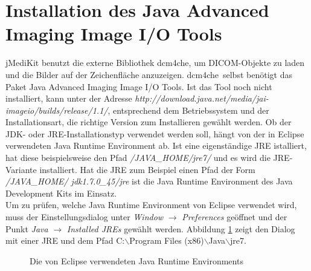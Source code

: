\section{Installation des Java Advanced Imaging Image I/O Tools}
jMediKit benutzt die externe Bibliothek \glqq dcm4che\grqq, um DICOM-Objekte zu laden und die Bilder auf der Zeichenfläche anzuzeigen. \glqq dcm4che\grqq\ selbst benötigt das Paket \glqq Java Advanced Imaging Image I/O Tools\grqq. Ist das Tool noch nicht installiert, kann unter der Adresse \textit{http://download.java.net/media/jai-imageio/builds/release/1.1/}, entsprechend dem Betriebssystem und der Installationsart, die richtige Version zum Installieren gewählt werden. Ob der JDK- oder JRE-Installationstyp verwendet werden soll, hängt von der in Eclipse verwendeten Java Runtime Environment ab. Ist eine eigenständige JRE istalliert, hat diese beispielsweise den Pfad \textit{/JAVA\_HOME/jre7/} und es wird die JRE-Variante installiert. Hat die JRE zum Beispiel einen Pfad der Form \textit{/JAVA\_HOME/ jdk1.7.0\_45/jre} ist die Java Runtime Environment des Java Development Kits im Einsatz.\\
Um zu prüfen, welche Java Runtime Environment von Eclipse verwendet wird, muss der Einstellungsdialog unter \textit{Window} $\rightarrow$ \textit{Preferences} geöffnet und der Punkt \textit{Java} $\rightarrow$ \textit{Installed JREs} gewählt werden. Abbildung \ref{jai} zeigt den Dialog mit einer JRE und dem Pfad C:$\backslash$Program Files (x86)$\backslash$Java$\backslash$jre7.
\begin{figure}[H]
  \vspace{0.5cm}
  \centering
  \caption{Die von Eclipse verwendeten Java Runtime Environments}
  \label{jai}
  \vspace{0.5cm}
\end{figure}

